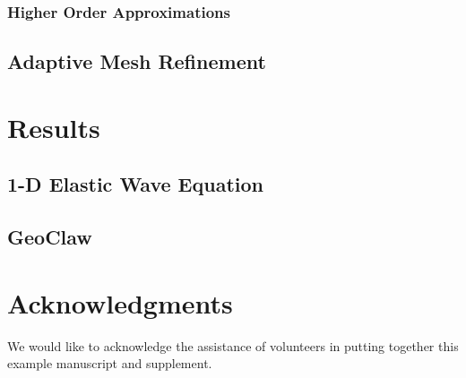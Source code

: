 \documentclass[review,onefignum,onetabnum]{siamart171218}
\begin{document}
\subsubsection{Higher Order Approximations}


\subsection{Adaptive Mesh Refinement}

\section{Results}

\subsection{1-D Elastic Wave Equation}

\subsection{GeoClaw}

\section*{Acknowledgments}
We would like to acknowledge the assistance of volunteers in putting
together this example manuscript and supplement.



\end{document}
